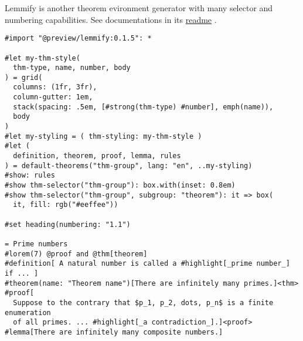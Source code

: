 Lemmify is another theorem evironment generator with many selector and
numbering capabilities. See documentations in its
\href{https://github.com/Marmare314/lemmify}{readme} .

\begin{verbatim}
#import "@preview/lemmify:0.1.5": *

#let my-thm-style(
  thm-type, name, number, body
) = grid(
  columns: (1fr, 3fr),
  column-gutter: 1em,
  stack(spacing: .5em, [#strong(thm-type) #number], emph(name)),
  body
)
#let my-styling = ( thm-styling: my-thm-style )
#let (
  definition, theorem, proof, lemma, rules
) = default-theorems("thm-group", lang: "en", ..my-styling)
#show: rules
#show thm-selector("thm-group"): box.with(inset: 0.8em)
#show thm-selector("thm-group", subgroup: "theorem"): it => box(
  it, fill: rgb("#eeffee"))

#set heading(numbering: "1.1")

= Prime numbers
#lorem(7) @proof and @thm[theorem]
#definition[ A natural number is called a #highlight[_prime number_] if ... ]
#theorem(name: "Theorem name")[There are infinitely many primes.]<thm>
#proof[
  Suppose to the contrary that $p_1, p_2, dots, p_n$ is a finite enumeration
  of all primes. ... #highlight[_a contradiction_].]<proof>
#lemma[There are infinitely many composite numbers.]
\end{verbatim}

\pandocbounded{}

